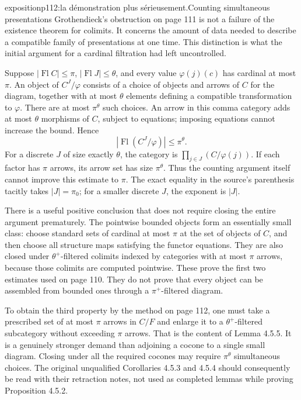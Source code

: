 \begin{dcomment}{exposition}{p112:la démonstration plus sérieusement.}{Counting simultaneous presentations}
Grothendieck's obstruction on page 111 is not a failure of the existence theorem for colimits. It concerns the amount of data needed to describe a compatible family of presentations at one time. This distinction is what the initial argument for a cardinal filtration had left uncontrolled.

Suppose $|\operatorname{Fl}C|\leq\pi$, $|\operatorname{Fl}J|\leq\theta$, and every value $\varphi(j)(c)$ has cardinal at most $\pi$. An object of $C^J/\varphi$ consists of a choice of objects and arrows of $C$ for the diagram, together with at most $\theta$ elements defining a compatible transformation to $\varphi$. There are at most $\pi^\theta$ such choices. An arrow in this comma category adds at most $\theta$ morphisms of $C$, subject to equations; imposing equations cannot increase the bound. Hence
\[
|\operatorname{Fl}(C^J/\varphi)|\leq\pi^\theta.
\]
For a discrete $J$ of size exactly $\theta$, the category is $\prod_{j\in J}(C/\varphi(j))$. If each factor has $\pi$ arrows, its arrow set has size $\pi^\theta$. Thus the counting argument itself cannot improve this estimate to $\pi$. The exact equality in the source's parenthesis tacitly takes $|J|=\pi_0$; for a smaller discrete $J$, the exponent is $|J|$.

There is a useful positive conclusion that does not require closing the entire argument prematurely. The pointwise bounded objects form an essentially small class: choose standard sets of cardinal at most $\pi$ at the set of objects of $C$, and then choose all structure maps satisfying the functor equations. They are also closed under $\theta^+$-filtered colimits indexed by categories with at most $\pi$ arrows, because those colimits are computed pointwise. These prove the first two estimates used on page 110. They do not prove that every object can be assembled from bounded ones through a $\pi^+$-filtered diagram.

To obtain the third property by the method on page 112, one must take a prescribed set of at most $\pi$ arrows in $C/F$ and enlarge it to a $\theta^+$-filtered subcategory without exceeding $\pi$ arrows. That is the content of Lemma 4.5.5. It is a genuinely stronger demand than adjoining a cocone to a single small diagram. Closing under all the required cocones may require $\pi^\theta$ simultaneous choices. The original unqualified Corollaries 4.5.3 and 4.5.4 should consequently be read with their retraction notes, not used as completed lemmas while proving Proposition 4.5.2.
\end{dcomment}

